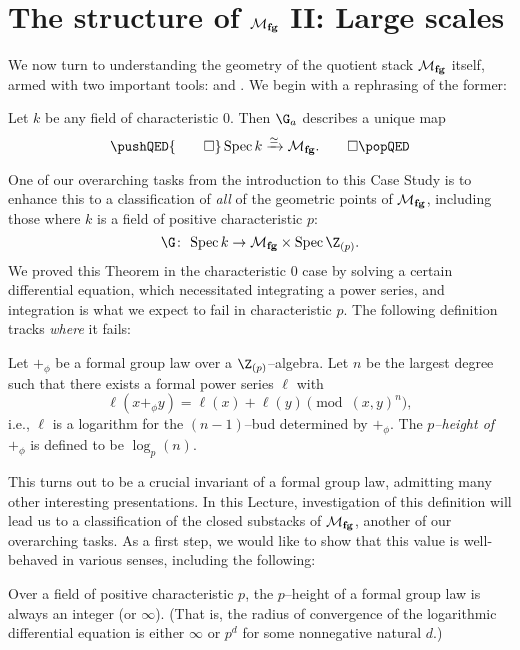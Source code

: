 \section{The structure of \texorpdfstring{$\mathcal{M}_{\mathbf{fg}}$}{Mfg} II: Large scales}\label{MfgII:LargeScales}

We now turn to understanding the geometry of the quotient stack $\mathcal{M}_{\mathbf{fg}}$ itself, armed with two important tools:  and .  We begin with a rephrasing of the former:

\begin{theorem}\label{RationalGeometricPointsOfMfg}
Let $k$ be any field of characteristic $0$.  Then $\G_a$ describes a unique map
\[\pushQED{\qed}
\Spec k \xrightarrow{\simeq} \moduli{fg}. \qedhere
\popQED\]
\end{theorem}

One of our overarching tasks from the introduction to this Case Study is to enhance this to a classification of \emph{all} of the geometric points of $\mathcal{M}_{\mathbf{fg}}$, including those where $k$ is a field of positive characteristic $p$: \[\G\co \Spec k \to \moduli{fg} \times \Spec \Z_{(p)}.\]  We proved this Theorem in the characteristic $0$ case by solving a certain differential equation, which necessitated integrating a power series, and integration is what we expect to fail in characteristic $p$.  The following definition tracks \emph{where} it fails:
\begin{definition}
Let $+_\phi$ be a formal group law over a $\Z_{(p)}$--algebra.  Let $n$ be the largest degree such that there exists a formal power series $\ell$ with \[\ell(x +_\phi y) = \ell(x) + \ell(y) \pmod{(x, y)^{n}},\] i.e., $\ell$ is a logarithm for the $(n-1)$--bud determined by $+_\phi$.  The \textit{$p$--height of $+_\phi$} is defined to be $\log_p(n)$.
\end{definition}

This turns out to be a crucial invariant of a formal group law, admitting many other interesting presentations.  In this Lecture, investigation of this definition will lead us to a classification of the closed substacks of $\mathcal{M}_{\mathbf{fg}}$, another of our overarching tasks.  As a first step, we would like to show that this value is well-behaved in various senses, including the following:
\begin{lemma}\label{FGLHeightIsAnInteger}
Over a field of positive characteristic $p$, the $p$--height of a formal group law is always an integer (or $\infty$).  (That is, the radius of convergence of the logarithmic differential equation is either $\infty$ or $p^d$ for some nonnegative natural $d$.)
\end{lemma}

